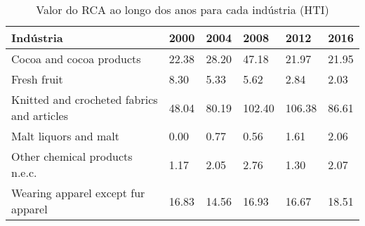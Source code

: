 \begin{table}
\centering
\caption{Valor do RCA ao longo dos anos para cada indústria (HTI)}
\begin{tabular}{p{6cm}p{1.5cm}p{1.5cm}p{1.5cm}p{1.5cm}p{1.5cm}}
\toprule
                                 Indústria &  2000 &  2004 &   2008 &   2012 &  2016 \\
\midrule
                  Cocoa and cocoa products & 22.38 & 28.20 &  47.18 &  21.97 & 21.95 \\
                               Fresh fruit &  8.30 &  5.33 &   5.62 &   2.84 &  2.03 \\
Knitted and crocheted fabrics and articles & 48.04 & 80.19 & 102.40 & 106.38 & 86.61 \\
                     Malt liquors and malt &  0.00 &  0.77 &   0.56 &   1.61 &  2.06 \\
            Other chemical products n.e.c. &  1.17 &  2.05 &   2.76 &   1.30 &  2.07 \\
        Wearing apparel except fur apparel & 16.83 & 14.56 &  16.93 &  16.67 & 18.51 \\
\bottomrule
\end{tabular}
\end{table}
